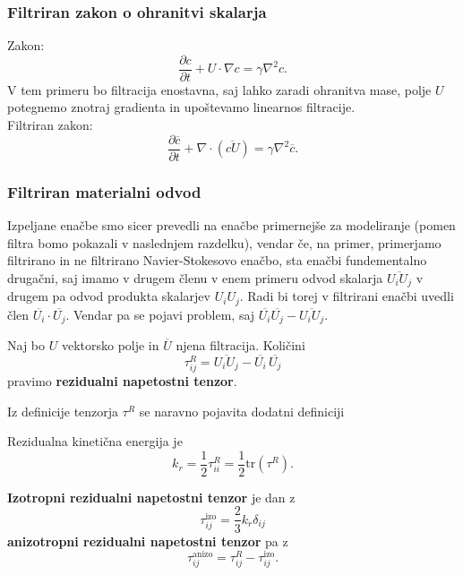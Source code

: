 \documentclass[mat2, tisk]{fmfdelo}
\begin{document}
\subsubsection{Filtriran zakon o ohranitvi skalarja}

Zakon:
$$
\frac{\partial c}{\partial t} + U\cdot\nabla c = \gamma \nabla^2 c.
$$
V tem primeru bo filtracija enostavna, saj lahko zaradi ohranitva mase, polje $U$ 
potegnemo znotraj gradienta in upoštevamo linearnos filtracije. \\
Filtriran zakon:
\begin{equation}
\frac{\partial \overline{c}}{\partial t} + \nabla \cdot (\overline{cU}) = \gamma \nabla^2 \overline{c}.
\end{equation}

\subsubsection{Filtriran materialni odvod}

Izpeljane enačbe smo sicer prevedli na enačbe primernejše za modeliranje (pomen filtra bomo 
pokazali v naslednjem razdelku), vendar če, na primer, primerjamo filtrirano in 
ne filtrirano Navier-Stokesovo enačbo, sta enačbi fundementalno drugačni, saj imamo 
v drugem členu v enem primeru odvod skalarja $\overline{U_i U_j}$ v drugem pa odvod produkta 
skalarjev $U_i U_j$. Radi bi torej v filtrirani enačbi uvedli člen $\overline{U_i} \cdot \overline{U_j}$.
Vendar pa se pojavi problem, saj $\overline{U_i}\overline{U_j} - \overline{U_i U_j}$. 
\begin{definicija}
Naj bo $U$ vektorsko polje in $\overline{U}$ njena filtracija. Količini 
\begin{equation}
\tau_{ij}^R = \overline{U_i U_j} - \overline{U_i} \,\overline{U_j}
\end{equation}
pravimo \textbf{rezidualni napetostni tenzor}.
\end{definicija}

Iz definicije tenzorja $\tau^R$ se naravno pojavita dodatni definiciji
\begin{definicija}
Rezidualna kinetična energija je 
\begin{equation}
k_r = \frac{1}{2} \tau_{ii}^R = \frac{1}{2}\text{tr}(\tau^R).
\end{equation}
\end{definicija}

\begin{definicija}
\textbf{Izotropni rezidualni napetostni tenzor} je dan z 
\begin{equation}
\tau_{ij}^\text{izo} = \frac{2}{3} k_r \delta_{ij}
\end{equation}
\textbf{anizotropni rezidualni napetostni tenzor} pa z 
\begin{equation}
\tau_{ij}^\text{anizo} = \tau_{ij}^R - \tau_{ij}^\text{izo}.
\end{equation}
\end{definicija}
\end{document}
